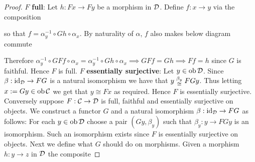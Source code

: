 \documentclass[a4paper,openany]{scrbook}
\renewcommand{\C}{\mathcal C}
\begin{document}
\begin{proof}
$F$ \textbf{full}: Let $h:Fx \to Fy$ be a morphism in $\mathcal D$. Define $f:x \to y$ via the composition
\begin{center}
\end{center} \noindent
so that $f = \alpha_y^{-1} \circ Gh \circ \alpha_x$. By naturality of $\alpha$, $f$ also makes below diagram commute
\begin{center}
\end{center} \noindent
Therefore $\alpha_y^{-1} \circ GFf \circ \alpha_x = \alpha_y^{-1} \circ Gh \circ \alpha_x \implies GFf = Gh \implies Ff = h$ since $G$ is faithful. Hence $F$ is full. \newline
$F$ \textbf{essentially surjective}: Let $y \in \operatorname{ob} \mathcal D$. Since $\beta: \operatorname{id}_{\mathcal D} \to FG$ is a natural isomorphism we have that $y \thickspace \substack{\beta_y \\ \cong} \thickspace FGy$. Thus letting $x := Gy \in \ob \C$ we get that $y \cong Fx$ as required. Hence $F$ is essentially surjective. Conversely suppose $F: \C \to \D$ is full, faithful and essentially surjective on objects. We construct a functor $G$ and a natural isomorphism $\beta: \operatorname{id}_\mathcal D \to FG$ as follows: For each $y \in \operatorname{ob} \mathcal D$ choose a pair $(Gy, \beta_y)$ such that $\beta_y:y \to FGy$ is an isomorphism. Such an isomorphism exists since $F$ is essentially surjective on objects. Next we define what $G$ should do on morphisms. Given a morphism $h: y \to z$ in $\mathcal D$ the composite

\end{proof}
\end{document}
